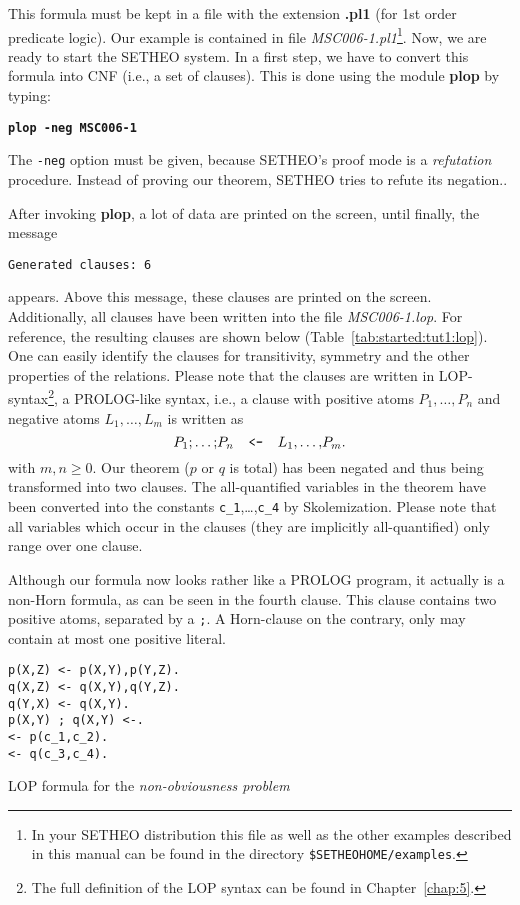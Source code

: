 This formula must be kept in a file with the extension {\bf .pl1}
(for 1st order predicate logic). Our example is contained in file
{\em MSC006-1.pl1\/}\footnote{
	In your SETHEO distribution this file as well as the other
	examples described in this manual can be found in the
	directory {\tt \$SETHEOHOME/examples}.}.
Now, we are ready to start the SETHEO system. In a first step, 
we have to convert this formula into CNF (i.e., a set of clauses).
This is done using the module {\bf plop} by typing:
\begin{center}
{\bf\tt plop -neg MSC006-1}
\end{center}

The {\tt -neg} option must be given, because SETHEO's proof mode is
a {\em refutation\/} procedure. Instead of proving our theorem, 
SETHEO tries to refute its negation.. 

After invoking {\bf plop},
a lot of data are printed on the screen, until finally, the message
\begin{center}
{\tt Generated clauses: 6} 
\end{center}
appears.
Above this message, these clauses are printed on the screen.
Additionally, all clauses have been written into the file
{\em MSC006-1.lop}.
For reference, the resulting clauses are shown below
(Table~\ref{tab:started:tut1:lop}).
One can easily identify the clauses for transitivity, symmetry and the other
properties of the relations.
Please note that the clauses are written in LOP-syntax\footnote{
	The full definition of the LOP syntax can be found
	in Chapter~\ref{chap:5}.},
a PROLOG-like syntax, i.e.,
a clause with positive atoms $P_1,\ldots,P_n$ and negative atoms
$L_1,\ldots,L_m$ is written as
\[ P_1 {\tt ;} \ldots {\tt ;} P_n \mbox{\tt \ \ <-\ \ }
L_1 {\tt ,} \ldots {\tt ,} P_m{\tt .} \]
with $m,n \geq 0$.
Our theorem ($p$ or $q$ is total) has been negated and thus being
transformed into two clauses. The all-quantified variables in the 
theorem have been converted into the constants {\tt c\_1},\ldots,{\tt c\_4}
by Skolemization.
Please note that all variables which occur in the clauses
(they are implicitly all-quantified) only range over one clause.

Although our formula now looks rather like a PROLOG program, it
actually is a non-Horn formula, as can be seen in the fourth clause.
This clause contains two positive atoms, separated by a {\tt ;}.
A Horn-clause on the contrary, only may contain at most one
positive literal.

\begin{table}[htb]
\begin{verbatim}
p(X,Z) <- p(X,Y),p(Y,Z).
q(X,Z) <- q(X,Y),q(Y,Z).
q(Y,X) <- q(X,Y).
p(X,Y) ; q(X,Y) <-.
<- p(c_1,c_2).
<- q(c_3,c_4).
\end{verbatim}
\caption{LOP formula for the {\em non-obviousness problem}}
\label{tab:started:tut1:lop}
\end{table}

